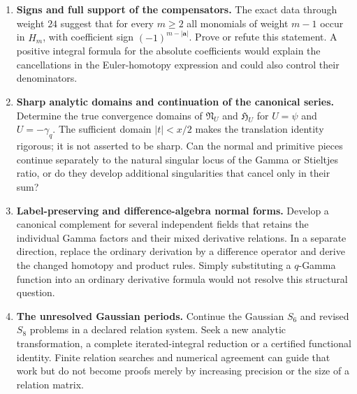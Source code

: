 \begin{enumerate}[label=\textbf{Q\arabic*.},leftmargin=*]
\item \textbf{Signs and full support of the compensators.}
The exact data through weight $24$ suggest that for every $m\ge2$
all monomials of weight $m-1$ occur in $H_m$, with coefficient sign
$(-1)^{m-|\boldsymbol a|}$.
Prove or refute this statement. A positive integral formula for the
absolute coefficients would explain the cancellations in the
Euler-homotopy expression and could also control their denominators.

\item \textbf{Sharp analytic domains and continuation of the canonical series.}
Determine the true convergence domains of $\mathfrak N_U$ and
$\mathfrak H_U$ for $U=\psi$ and $U=-\gamma_q$.
The sufficient domain $|t|<x/2$ makes the translation identity
rigorous; it is not asserted to be sharp. Can the normal and
primitive pieces continue separately to the natural singular locus
of the Gamma or Stieltjes ratio, or do they develop additional
singularities that cancel only in their sum?

\item \textbf{Label-preserving and difference-algebra normal forms.}
Develop a canonical complement for several independent fields that
retains the individual Gamma factors and their mixed derivative
relations. In a separate direction, replace the ordinary derivation
by a difference operator and derive the changed homotopy and product
rules. Simply substituting a $q$-Gamma function into an ordinary
derivative formula would not resolve this structural question.

\item \textbf{The unresolved Gaussian periods.}
Continue the Gaussian $S_6$ and revised $S_8$ problems in a declared
relation system. Seek a new analytic transformation, a complete
iterated-integral reduction or a certified functional identity.
Finite relation searches and numerical agreement can guide that
work but do not become proofs merely by increasing precision or
the size of a relation matrix.
\end{enumerate}
